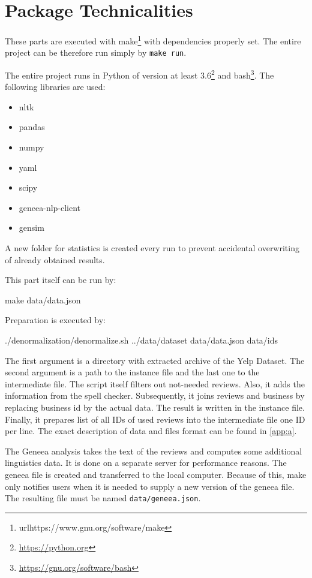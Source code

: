 \chapter{Package Technicalities}\label{app:techn}

These parts are executed with make\footnote{url{https://www.gnu.org/software/make}} with dependencies properly set.
The entire project can be therefore run simply by \texttt{make run}.

The entire project runs in Python of version at least 3.6\footnote{\url{https://python.org}} and bash\footnote{\url{https://gnu.org/software/bash}}.
The following libraries are used:

\begin{itemize}
\item nltk
\item pandas
\item numpy
\item yaml
\item scipy
\item geneea-nlp-client
\item gensim
\end{itemize}

A new folder for statistics is created every run to prevent accidental overwriting of already obtained results.

This part itself can be run by:

\begin{code}
make data/data.json
\end{code}


Preparation is executed by:

\begin{code}
./denormalization/denormalize.sh ../data/dataset data/data.json data/ids
\end{code}

The first argument is a directory with extracted archive of the Yelp Dataset.
The second argument is a path to the instance file and the last one to the intermediate file.
The script itself filters out not-needed reviews.
Also, it adds the information from the spell checker.
Subsequently, it joins reviews and business by replacing business id by the actual data.
The result is written in the instance file.
Finally, it prepares list of all IDs of used reviews into the intermediate file one ID per line.
The exact description of data and files format can be found in \autoref{app:a}.

The Geneea analysis takes the text of the reviews and computes some additional linguistics data.
It is done on a separate server for performance reasons.
The geneea file is created and transferred to the local computer.
Because of this, make only notifies users when it is needed to supply a new version of the geneea file.
The resulting file must be named \texttt{data/geneea.json}.

